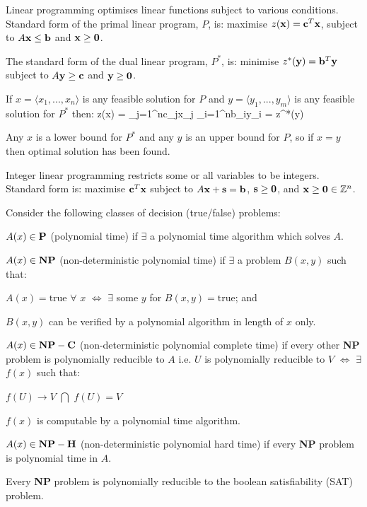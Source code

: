 \subject{Linear Programming}

    Linear programming optimises linear functions subject to various conditions. Standard form of the primal linear program, $P$, is: maximise $z({\bf x}) = {\bf c}^T {\bf x}$, subject to $A{\bf x} \leq {\bf b}$ and ${\bf x} \geq {\bf 0}$.

    The standard form of the dual linear program, $P^{*}$, is: minimise $z^{*}({\bf y}) = {\bf b}^T {\bf y}$ subject to $A{\bf y} \geq {\bf c}$ and ${\bf y} \geq {\bf 0}$.



    If $x = \langle x_{1}, ..., x_{n} \rangle$ is any feasible solution for $P$ and $y = \langle y_{1}, ..., y_{m} \rangle$ is any feasible solution for $P^{*}$ then:
        \startformula
            z(x) = \sum_{j=1}^{n}c_{j}x_{j} \leq \sum_{i=1}^{n}b_{i}y_{i} = z^{*}(y)
        \stopformula

        Any $x$ is a lower bound for $P^{*}$ and any $y$ is an upper bound for $P$, so if $x = y$ then optimal solution has been found.


    Integer linear programming restricts some or all variables to be integers. Standard form is: maximise ${\bf c}^T {\bf x}$ subject to $A{\bf x} + {\bf s} = {\bf b}$, ${\bf s} \geq {\bf 0}$, and ${\bf x} \geq {\bf 0} \in \mathbb{Z}^{n}$.

\subject{Intractability}

    Consider the following classes of decision (true/false) problems:

    \startitemize
        \item $A(x) \in {\bf P}$ (polynomial time) if $\exists$ a polynomial time algorithm which solves $A$.
        \item $A(x) \in {\bf NP}$ (non-deterministic polynomial time) if $\exists$ a problem $B(x, y)$ such that:
        \startitemize
            \item $A(x) = \text{true}$ $\forall$ $x$ $\iff$ $\exists$ some $y$ for $B(x, y) = \text{true}$; and
            \item $B(x, y)$ can be verified by a polynomial algorithm in length of $x$ only.
        \stopitemize
        \item $A(x) \in {\bf NP-C}$ (non-deterministic polynomial complete time) if every other {\bf NP} problem is polynomially reducible to $A$ i.e. $U$ is polynomially reducible to $V$ $\iff$ $\exists$ $f(x)$ such that:
        \startitemize
            \item $f(U) \rightarrow V$ $\bigcap$ $f(U) = V$
            \item $f(x)$ is computable by a polynomial time algorithm.
        \stopitemize
        \item $A(x) \in {\bf NP-H}$ (non-deterministic polynomial hard time) if every {\bf NP} problem is polynomial time in $A$.
    \stopitemize


        Every {\bf NP} problem is polynomially reducible to the boolean satisfiability (SAT) problem.
